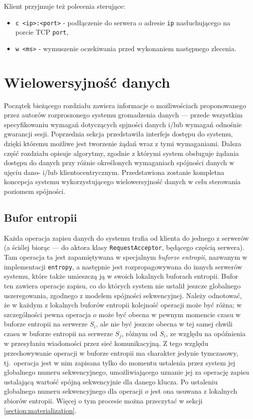 Klient przyjmuje też polecenia sterujące:

\begin{itemize}
    \item \texttt{c <ip>:<port>} - podłączenie do serwera o adresie \texttt{ip} nasłuchującego na porcie TCP \texttt{port},
    \item \texttt{w <ms>} - wymuszenie oczekiwania przed wykonaniem następnego zlecenia.
\end{itemize}


\section{Wielowersyjność danych} \label{section:multiversioning_realization}

Początek bieżącego rozdziału zawiera informacje o możliwościach proponowanego przez autorów rozproszonego systemu gromadzenia danych --- przede wszystkim specyfikowaniu wymagań dotyczących spjności danych i/lub wymagań odnośnie gwarancji sesji. Poprzednia sekcja przedstawiła interfejs dostępu do systemu, dzięki któremu możliwe jest tworzenie żądań wraz z tymi wymaganiami. Dalsza część rozdziału opisuje algorytmy, zgodnie z którymi system obsługuje żądania dostępu do danych przy różnie określonych wymaganiach spójności danych w ujęciu dano- i/lub klientocentrycznym. Przedstawiona zostanie kompletna koncepcja systemu wykorzystującego wielowersyjność danych w celu sterowania poziomem spójności.

\subsection{Bufor entropii}

Każda operacja zapisu danych do systemu trafia od klienta do jednego z serwerów (a ściślej biorąc
--- do aktora klasy \texttt{RequestAcceptor}, będącego częścią serwera). Tam operacja ta jest
zapamiętywana w specjalnym \textit{buforze entropii}, nazwanym w implementacji \texttt{entropy}, a
następnie jest rozpropagowywana do innych serwerów systemu, które także umieszczą ją w swoich
lokalnych buforach entropii. Bufor ten zawiera operacje zapisu, co do których system nie ustalił
jeszcze globalnego uszeregowania, zgodnego z modelem spójności sekwencyjnej. Należy odnotować, że w
każdym z lokalnych buforów entropii kolejność operacji może być różna; w szczególności pewna
operacja $ o $ może być obecna w pewnym momencie czasu w buforze entropii na serwerze $ S_i $, ale
nie być jeszcze obecna w tej samej chwili czasu w buforze entropii na serwerze $ S_j $, różnym od $
S_i $, ze względu na opóźnienia w przesyłaniu wiadomości przez sieć komunikacyjną. Z tego względu
przechowywanie operacji w buforze entropii ma charakter jedynie tymczasowy, tj.\ operacja jest w nim zapisana tylko do momentu ustalenia przez system jej globalnego numeru sekwencyjnego, umożliwiającego uznanie jej za operację zapisu ustalającą wartość spójną sekwencyjnie dla danego klucza. Po ustaleniu globalnego numeru sekwencyjnego dla operacji $ o $ jest ona usuwana z lokalnych zbiorów entropii. Więcej o tym procesie można przeczytać w sekcji \ref{section:materialization}.

